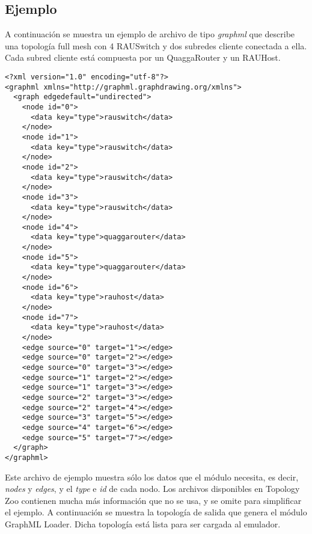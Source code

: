 \subsection{Ejemplo}
A continuación se muestra un ejemplo de archivo de tipo \textit{graphml} que describe una topología full mesh con 4 RAUSwitch y dos subredes cliente conectada a ella. Cada subred cliente está compuesta por un QuaggaRouter y un RAUHost.
\begin{verbatim}
<?xml version="1.0" encoding="utf-8"?>
<graphml xmlns="http://graphml.graphdrawing.org/xmlns">
  <graph edgedefault="undirected">
    <node id="0">
      <data key="type">rauswitch</data>
    </node>
    <node id="1">
      <data key="type">rauswitch</data>
    </node>
    <node id="2">
      <data key="type">rauswitch</data>
    </node>
    <node id="3">
      <data key="type">rauswitch</data>
    </node>
    <node id="4">
      <data key="type">quaggarouter</data>
    </node>
    <node id="5">
      <data key="type">quaggarouter</data>
    </node>
    <node id="6">
      <data key="type">rauhost</data>
    </node>
    <node id="7">
      <data key="type">rauhost</data>
    </node>
    <edge source="0" target="1"></edge>
    <edge source="0" target="2"></edge>
    <edge source="0" target="3"></edge>
    <edge source="1" target="2"></edge>
    <edge source="1" target="3"></edge>
    <edge source="2" target="3"></edge>
    <edge source="2" target="4"></edge>
    <edge source="3" target="5"></edge>
    <edge source="4" target="6"></edge>
    <edge source="5" target="7"></edge>
  </graph>
</graphml>
\end{verbatim}
Este archivo de ejemplo muestra sólo los datos que el módulo necesita, es decir, \textit{nodes} y \textit{edges}, y el \textit{type} e \textit{id} de cada nodo. Los archivos disponibles en Topology Zoo contienen mucha más información que no se usa, y se omite para simplificar el ejemplo.
A continuación se muestra la topología de salida que genera el módulo GraphML Loader. Dicha topología está lista para ser cargada al emulador.
